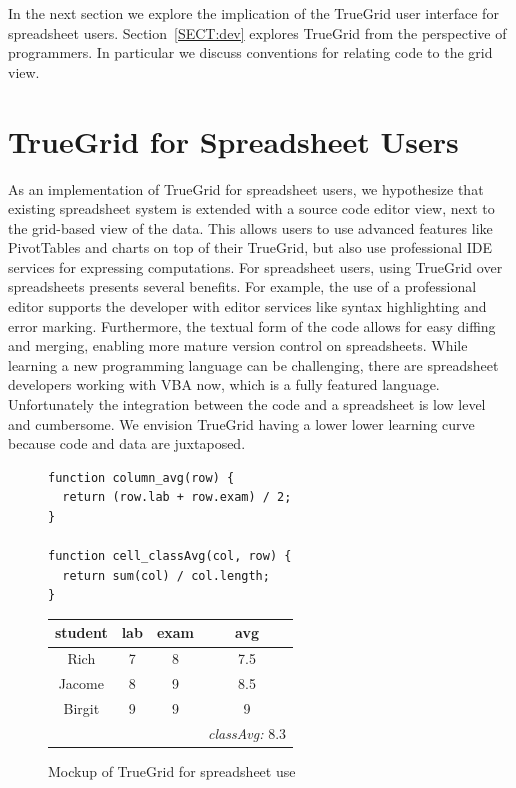 \documentclass{llncs}
\begin{document}
In the next section we explore the implication of the TrueGrid user interface for spreadsheet users. Section~\ref{SECT:dev} explores TrueGrid from the perspective of programmers. In particular we discuss conventions for relating code to the grid view. 

\section{TrueGrid for Spreadsheet Users}

As an implementation of TrueGrid for spreadsheet users, we hypothesize that existing spreadsheet system is extended with a source code editor view, next to the grid-based view of the data. This allows users to  use advanced features like PivotTables and charts on top of their TrueGrid, but also use professional IDE services for expressing computations. For spreadsheet users, using TrueGrid over spreadsheets presents several benefits. For example, the use of a professional  editor supports the developer with editor services like syntax highlighting and error marking. Furthermore, the textual form of the code allows for easy diffing and merging, enabling more mature version control on spreadsheets. While learning a new programming language can be challenging, there are spreadsheet developers working with VBA now, which is a fully featured language. Unfortunately the integration between the code and a spreadsheet is low level and cumbersome. We envision TrueGrid having a lower lower learning curve because code and data are juxtaposed.

\begin{figure}[t]
\begin{minipage}{0.6\linewidth}
\begin{lstlisting}
function column_avg(row) {
  return (row.lab + row.exam) / 2;
}

function cell_classAvg(col, row) {   
  return sum(col) / col.length; 
}
\end{lstlisting}
\end{minipage}
\begin{minipage}{0.38\linewidth}
\centering
\sffamily
\begin{tabular}{|c|c|c|c|}\hline
student & lab & exam & avg\\\hline\hline
Rich   & 7 & 8 & 7.5 \\\hline
Jacome & 8 & 9 & 8.5\\\hline
Birgit & 9 & 9 & 9 \\\hline
 & & & \textit{classAvg:} 8.3 \\\hline
\end{tabular}
\end{minipage}
\caption{Mockup of TrueGrid for spreadsheet use}
\label{FIG:grades}
\end{figure}
\end{document}
